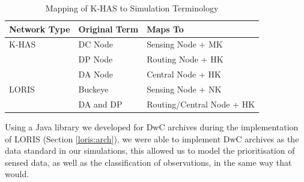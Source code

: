	\begin{table}[h]
	\centering
	\begin{tabular}{|l|l|l|}
	\hline
	\textbf{Network Type} & \textbf{Original Term} & \textbf{Maps To}          \\
	\hline
	K-HAS                 & DC Node                & Sensing Node + MK         \\
	                      & DP Node                & Routing Node + HK         \\
	                      & DA Node                & Central Node + HK         \\
	LORIS                 & Buckeye                & Sensing Node + NK         \\
	                      & DA and DP              & Routing/Central Node + HK \\
	\hline
	\end{tabular}
	\caption{Mapping of K-HAS to Simulation Terminology}
	\label{sim:tab:terms}
	\end{table}

Using a Java library we developed for DwC archives during the implementation of LORIS (Section \ref{loris:arch}), we were able to implement DwC archives as the data standard in our simulations, this allowed us to model the prioritisation of sensed data, as well as the classification of observations, in the same way that \DIFdelbegin {}\DIFdelend \DIFaddbegin {}\DIFaddend would.

\DIFdelbegin {}\textit{} %
\DIFdelend \DIFaddbegin \section{}\label{sim:setup}

